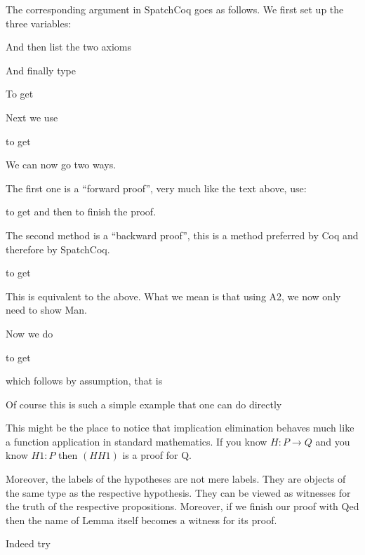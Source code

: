 The corresponding argument in SpatchCoq goes as follows. We first set up the three variables:


And then list the two axioms


And finally type

To get

Next we use

to get


We can now go two ways. 

The first one is a ``forward proof'', very much like the text above, use:

to get
and then 
to finish the proof.

The second method is a ``backward proof'', this is a method preferred by Coq and therefore by SpatchCoq.

 
 to get

This is equivalent to the above. What we mean is that using A2, we now only need to show Man.

Now we do
 
 to get
 
 which follows by assumption, that is
 
 
 Of course this is such a simple example that one can do directly 
 
 
\begin{tcolorbox}[colback=red!5!white,colframe=black]
This might be the place to notice that implication elimination behaves much like a function application in standard mathematics. If you know $H:P\rightarrow Q$  and you know $H1:P$ then $(H H1)$ is a proof for Q. 

Moreover, the labels of the hypotheses are not mere labels. They are objects of the same type as the respective hypothesis. They can be viewed as witnesses for the truth of the respective propositions. Moreover, if we finish our proof with Qed then the name of Lemma itself becomes a witness for its proof.

 
 \end{tcolorbox}
Indeed try

